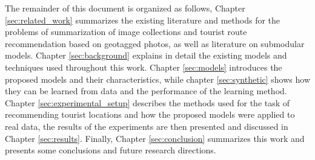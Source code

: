 The remainder of this document is organized as follows, Chapter \ref{sec:related_work} summarizes the existing literature and methods for the problems of summarization of image collections and tourist route recommendation based on geotagged photos, as well as literature on submodular models. Chapter \ref{sec:background} explains in detail the existing models and techniques used throughout this work. Chapter \ref{sec:models} introduces the proposed models and their characteristics, while chapter \ref{sec:synthetic} shows how they can be learned from data and the performance of the learning method. Chapter \ref{sec:experimental_setup} describes the methods used for the task of recommending tourist locations and how the proposed models were applied to real data, the results of the experiments are then presented and discussed in Chapter \ref{sec:results}. Finally, Chapter \ref{sec:conclusion} summarizes this work and presents some conclusions and future research directions.
